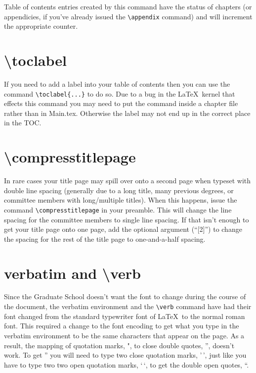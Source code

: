 Table of contents entries created by this command have the status of chapters (or appendicies, if you've already issued the \verb=\appendix= command) and will increment the appropriate counter.

\section{\textbackslash toclabel}
If you need to add a label into your table of contents then you can use the command \verb=\toclabel{...}= to do so.  Due to a bug in the \LaTeX\ kernel that effects this command you may need to put the command inside a chapter file rather than in Main.tex. Otherwise the label may not end up in the correct place in the TOC.

\section{\textbackslash compresstitlepage}
In rare cases your title page may spill over onto a second page when typeset with double line spacing (generally due to a long title, many previous degrees, or committee members with long/multiple titles).  When this happens, issue the command \verb=\compresstitlepage= in your preamble.  This will change the line spacing for the committee members to single line spacing.  If that isn't enough to get your title page onto one page, add the optional argument (``[2]'') to change the spacing for the rest of the title page to one-and-a-half spacing.

\section{verbatim and \textbackslash verb}
Since the Graduate School doesn't want the font to change during the course of the document, the verbatim environment and the \verb=\verb= command have had their font changed from the standard typewriter font of \LaTeX\ to the normal roman font.  This required a change to the font encoding to get what you type in the verbatim environment to be the same characters that appear on the page.  As a result, the mapping of quotation marks, ", to close double quotes, '', doesn't work.  To get '' you will need to type two close quotation marks, '\,', just like you have to type two two open quotation marks, `\,`, to get the double open quotes, ``.

